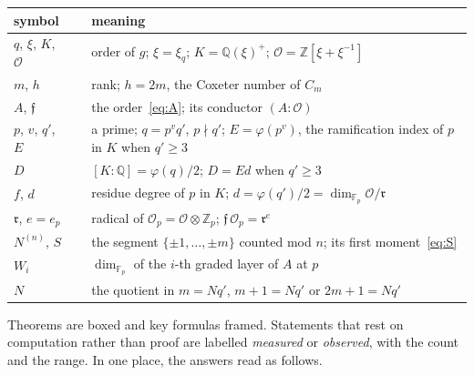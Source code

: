 \documentclass[11pt,a4paper]{article}
\theoremstyle{definition}
\newcommand{\ZZ}{\mathbb{Z}}
\newcommand{\QQ}{\mathbb{Q}}
\newcommand{\FF}{\mathbb{F}}
\newcommand{\cO}{\mathcal{O}}
\newcommand{\cf}{\mathfrak{f}}
\newcommand{\rad}{\mathfrak{r}}
\begin{document}
\medskip
\begin{center}\small
{}
\begin{tabular}{llp{}}
\toprule
symbol & & meaning \\
\midrule
$q$, $\xi$, $K$, $\cO$ & & order of $g$; $\xi=\xi_q$; $K=\QQ(\xi)^+$; $\cO=\ZZ[\xi+\xi^{-1}]$ \\
$m$, $h$ & & rank; $h=2m$, the Coxeter number of $C_m$ \\
$A$, $\cf$ & & the order~\eqref{eq:A}; its conductor $(A:\cO)$ \\
$p$, $v$, $q'$, $E$ & & a prime; $q=p^vq'$, $p\nmid q'$; $E=\varphi(p^v)$, the ramification index of $p$ in $K$ when $q'\ge3$ \\
$D$ & & $[K:\QQ]=\varphi(q)/2$; $D=Ed$ when $q'\ge3$ \\
$f$, $d$ & & residue degree of $p$ in $K$; $d=\varphi(q')/2=\dim_{\FF_p}\cO/\rad$ \\
$\rad$, $e=e_p$ & & radical of $\cO_p=\cO\otimes\ZZ_p$; $\cf\,\cO_p=\rad^{e}$ \\
$N^{(n)}$, $S$ & & the segment $\{\pm1,\dots,\pm m\}$ counted mod $n$; its first moment~\eqref{eq:S} \\
$W_i$ & & $\dim_{\FF_p}$ of the $i$-th graded layer of $A$ at $p$ \\
$N$ & & the quotient in $m=Nq'$, $m+1=Nq'$ or $2m+1=Nq'$ \\
\bottomrule
\end{tabular}
\end{center}

\noindent Theorems are boxed and key formulas framed. Statements that rest on computation rather than proof are
labelled \emph{measured} or \emph{observed}, with the count and the range. In one place, the answers read as follows.
\end{document}
